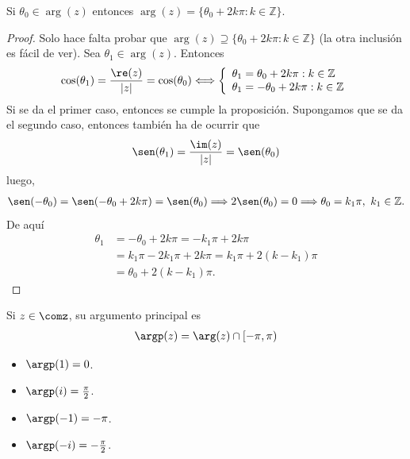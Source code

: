 \begin{prop}
Si $\theta_0 \in \arg(z)$ entonces $\arg(z) = \{ \theta_0 + 2k\pi : k \in \mathbb{Z} \}$.
\end{prop}

\begin{proof}
Solo hace falta probar que $\arg(z) \supseteq \{ \theta_0 + 2k\pi : k \in \mathbb{Z} \}$ (la otra inclusión es fácil de ver). Sea $\theta_1 \in \arg(z)$. Entonces
\begin{align*}
    \cos(\theta_1) = \frac{\re(z)}{|z|} = \cos(\theta_0) \Longleftrightarrow \left\{ \begin{array}{lcc}
            \theta_1 = \theta_0 + 2k\pi : k \in \mathbb{Z} \\
            \theta_1 = -\theta_0 + 2k\pi : k \in \mathbb{Z}\\
             \end{array}
        \right.
\end{align*}
Si se da el primer caso, entonces se cumple la proposición. Supongamos que se da el segundo caso, entonces también ha de ocurrir que
\begin{align*}
    \sen(\theta_1) = \frac{\im(z)}{|z|} = \sen(\theta_0)
\end{align*}
luego, 
\begin{align*}
    \sen(-\theta_0) = \sen(-\theta_0 + 2k\pi) = \sen(\theta_0) \Longrightarrow 2\sen(\theta_0) = 0 \Longrightarrow \theta_0 = k_1\pi, \  k_1 \in \mathbb{Z}.
\end{align*}
De aquí
\begin{align*}
    \theta_1 &= -\theta_0 + 2k\pi = -k_1\pi + 2k\pi \\
    &= k_1\pi - 2k_1\pi + 2k\pi = k_1\pi + 2(k - k_1)\pi \\
    &= \theta_0 + 2(k - k_1)\pi.
\end{align*}
\end{proof}

\begin{defi}
Si $z \in \comz$, su argumento principal es 
\begin{align*}
    \argp(z) = \arg(z) \cap [-\pi,\pi)
\end{align*}
\end{defi}

\begin{ejemplo}
\begin{itemize}
    \item $\argp(1) = 0$.
    \item $\argp(i) = \frac{\pi}{2}$.
    \item $\argp(-1) = -\pi$.
    \item $\argp(-i) = -\frac{\pi}{2}$.
\end{itemize}
\end{ejemplo}

